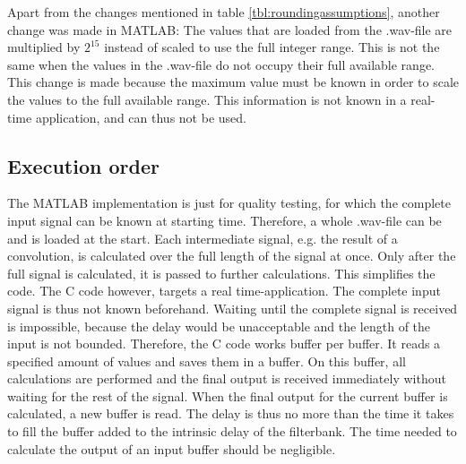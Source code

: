 \documentclass[a4paper]{article}
\begin{document}
Apart from the changes mentioned in table \ref{tbl:roundingassumptions}, another change was made in MATLAB: The values that are loaded from the .wav-file are multiplied by $2^{15}$ instead of scaled to use the full integer range. This is not the same when the values in the .wav-file do not occupy their full available range. This change is made because the maximum value must be known in order to scale the values to the full available range. This information is not known in a real-time application, and can thus not be used.
\begin{table}[htb]
\centering
{}
\caption{False assumptions about rounding mechanisms, with their corrections and solutions}
\label{tbl:roundingassumptions}
\end{table}

\subsection{Execution order}
The MATLAB implementation is just for quality testing, for which the complete input signal can be known at starting time. Therefore, a whole .wav-file can be and is loaded at the start. Each intermediate signal, e.g. the result of a convolution, is calculated over the full length of the signal at once. Only after the full signal is calculated, it is passed to further calculations. This simplifies the code. The C code however, targets a real time-application. The complete input signal is thus not known beforehand. Waiting until the complete signal is received is impossible, because the delay would be unacceptable and the length of the input is not bounded. Therefore, the C code works buffer per buffer. It reads a specified amount of values and saves them in a buffer. On this buffer, all calculations are performed and the final output is received immediately without waiting for the rest of the signal. When the final output for the current buffer is calculated, a new buffer is read. The delay is thus no more than the time it takes to fill the buffer added to the intrinsic delay of the filterbank. The time needed to calculate the output of an input buffer should be negligible. \\
\end{document}
